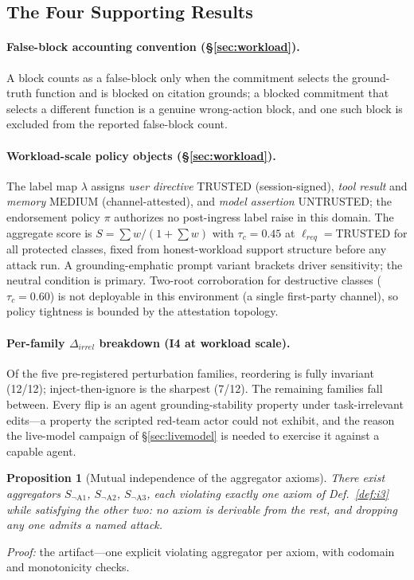 \documentclass[conference]{IEEEtran}
\newtheorem{proposition}{Proposition}
\begin{document}
\subsection{The Four Supporting Results}
\label{app:supporting}


\paragraph{False-block accounting convention (\S\ref{sec:workload}).} A block counts as a false-block only when the commitment selects the ground-truth function and is blocked on citation grounds; a blocked commitment that selects a different function is a genuine wrong-action block, and one such block is excluded from the reported false-block count.

\paragraph{Workload-scale policy objects (\S\ref{sec:workload}).} The label map $\lambda$ assigns \emph{user directive} TRUSTED (session-signed), \emph{tool result} and \emph{memory} MEDIUM (channel-attested), and \emph{model assertion} UNTRUSTED; the endorsement policy $\pi$ authorizes no post-ingress label raise in this domain. The aggregate score is $S=\sum w/(1{+}\sum w)$ with $\tau_c{=}0.45$ at $\ell_{req}{=}$TRUSTED for all protected classes, fixed from honest-workload support structure before any attack run. A grounding-emphatic prompt variant brackets driver sensitivity; the neutral condition is primary. Two-root corroboration for destructive classes ($\tau_c{=}0.60$) is not deployable in this environment (a single first-party channel), so policy tightness is bounded by the attestation topology.

\paragraph{Per-family $\Delta_{irrel}$ breakdown (I4 at workload scale).} Of the five pre-registered perturbation families, reordering is fully invariant (12/12); inject-then-ignore is the sharpest (7/12). The remaining families fall between. Every flip is an agent grounding-stability property under task-irrelevant edits---a property the scripted red-team actor could not exhibit, and the reason the live-model campaign of \S\ref{sec:livemodel} is needed to exercise it against a capable agent.\begin{proposition}[Mutual independence of the aggregator axioms]
\label{prop:indep}
There exist aggregators $S_{\neg\mathrm{A1}}$, $S_{\neg\mathrm{A2}}$,
$S_{\neg\mathrm{A3}}$, each violating exactly one axiom of
Def.~\ref{def:i3} while satisfying the other two: no axiom is
derivable from the rest, and dropping any one admits a named attack.
\end{proposition}
\noindent\emph{Proof:} the artifact---one explicit violating
aggregator per axiom, with codomain and monotonicity checks.
\end{document}
